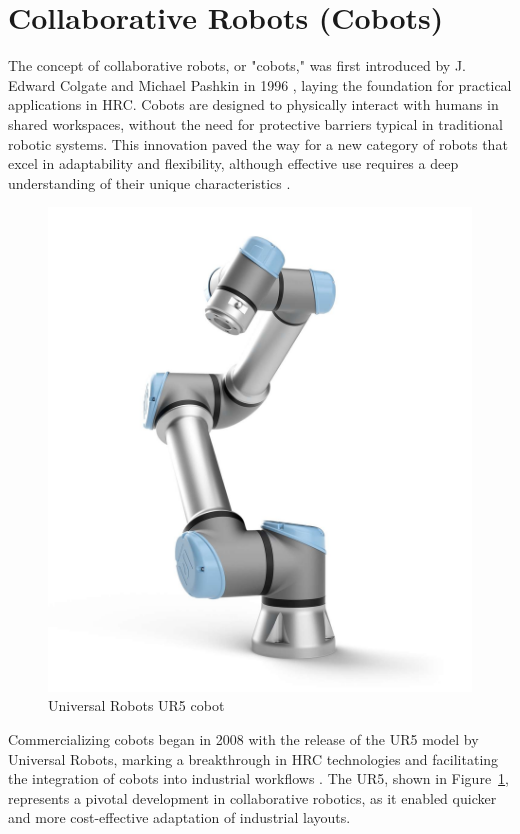 \section{Collaborative Robots (Cobots)} 

The concept of collaborative robots, or "cobots," was first introduced by J. Edward Colgate and Michael Pashkin in 1996 \cite{cobot-definition}, laying the foundation for practical applications in \ac{HRC}. Cobots are designed to physically interact with humans in shared workspaces, without the need for protective barriers typical in traditional robotic systems. This innovation paved the way for a new category of robots that excel in adaptability and flexibility, although effective use requires a deep understanding of their unique characteristics \cite{robotics8040100}.

\begin{figure}[!htbp]
    \centering
    \includegraphics[width=0.4\linewidth]{figs/ur5.jpg}
    \caption{Universal Robots UR5 cobot} 
    \label{fig:ur5}
\end{figure} 

Commercializing cobots began in 2008 with the release of the UR5 model by Universal Robots, marking a breakthrough in \ac{HRC} technologies and facilitating the integration of cobots into industrial workflows \cite{robotics8040100}. The UR5, shown in Figure~\ref{fig:ur5}, represents a pivotal development in collaborative robotics, as it enabled quicker and more cost-effective adaptation of industrial layouts.


